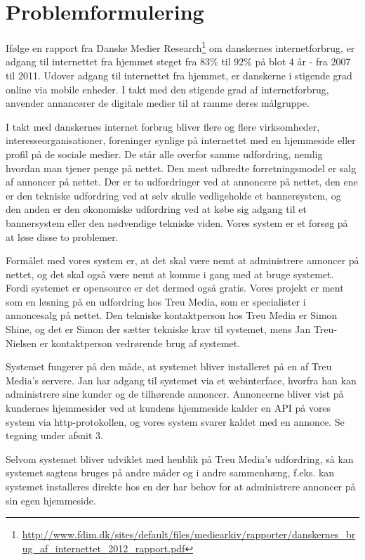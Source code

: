 \documentclass[a4paper,12pt]{article}
\begin{document}
\section{Problemformulering}

Ifølge en rapport fra Danske Medier Research\footnote{\url{ http://www.fdim.dk/sites/default/files/mediearkiv/rapporter/danskernes\_brug\_af\_internettet\_2012\_rapport.pdf}} om danskernes internetforbrug, er adgang til internettet fra hjemmet steget fra 83\% til 92\% på blot 4 år - fra 2007 til 2011. Udover adgang til internettet fra hjemmet, er danskerne i stigende grad online via mobile enheder. I takt med den stigende grad af internetforbrug, anvender annancører de digitale medier til at ramme deres målgruppe.

I takt med danskernes internet forbrug bliver flere og flere virksomheder, interesseorganisationer, foreninger synlige på internettet med en hjemmeside eller profil på de sociale medier. De står alle overfor samme udfordring, nemlig hvordan man tjener penge på nettet. Den mest udbredte forretningsmodel er salg af annoncer på nettet. Der er to udfordringer ved at annoncere på nettet, den ene er den tekniske udfordring ved at selv skulle vedligeholde et bannersystem, og den anden er den økonomiske udfordring ved at købe sig adgang til et bannersystem eller den nødvendige tekniske viden. Vores system er et forsøg på at løse disse to problemer.

Formålet med vores system er, at det skal være nemt at administrere annoncer på nettet, og det skal også være nemt at komme i gang med at bruge systemet. Fordi systemet er opensource er det dermed også gratis. Vores projekt er ment som en løsning på en udfordring hos Treu Media, som er specialister i annoncesalg på nettet. Den tekniske kontaktperson hos Treu Media er Simon Shine, og det er Simon der sætter tekniske krav til systemet, mens Jan Treu-Nielsen er kontaktperson vedrørende brug af systemet.

Systemet fungerer på den måde, at systemet bliver installeret på en af Treu Media's servere. Jan har adgang til systemet via et webinterface, hvorfra han kan administrere sine kunder og de tilhørende annoncer. Annoncerne bliver vist på kundernes hjemmesider ved at kundens hjemmeside kalder en API på vores system via http-protokollen, og vores system svarer kaldet med en annonce. Se tegning under afsnit 3.

Selvom systemet bliver udviklet med henblik på Treu Media's udfordring, så kan systemet sagtens bruges på andre måder og i andre sammenhæng, f.eks. kan systemet installeres direkte hos en der har behov for at administrere annoncer på sin egen hjemmeside.
\end{document}
